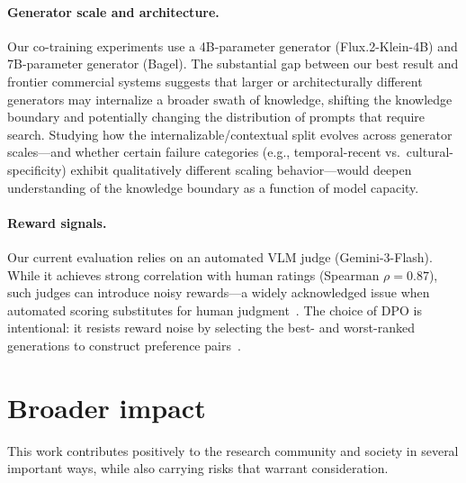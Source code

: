 \paragraph{Generator scale and architecture.}
Our co-training experiments use a 4B-parameter generator (Flux.2-Klein-4B) and 7B-parameter generator (Bagel).
The substantial gap between our best result and frontier commercial systems suggests that larger or architecturally different generators may internalize a broader swath of knowledge, shifting the knowledge boundary and potentially changing the distribution of prompts that require search.
Studying how the internalizable/contextual split evolves across generator scales---and whether certain failure categories (e.g., temporal-recent vs.\ cultural-specificity) exhibit qualitatively different scaling behavior---would deepen understanding of the knowledge boundary as a function of model capacity.

\paragraph{Reward signals.}
Our current evaluation relies on an automated VLM judge (Gemini-3-Flash).
While it achieves strong correlation with human ratings (Spearman $\rho = 0.87$), such judges can introduce noisy rewards---a widely acknowledged issue when automated scoring substitutes for human judgment~\cite{wiles2024gecko,lee2024heim}.
The choice of DPO is intentional: it resists reward noise by selecting the best- and worst-ranked generations to construct preference pairs~\cite{rafailov2023dpo}.

\section{Broader impact}
\label{app:broader}
This work contributes positively to the research community and society in several important ways, while also carrying risks that warrant consideration.

